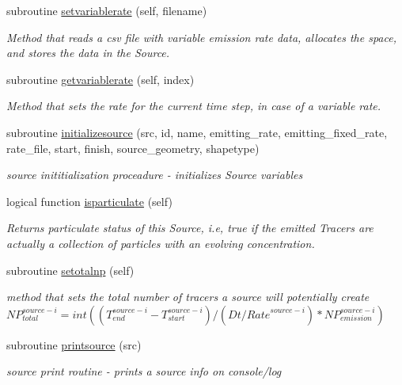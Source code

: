 \begin{DoxyCompactItemize}
subroutine \mbox{\hyperlink{namespacesources__mod_af7fab14b56573184d5ca4371409118b0}{setvariablerate}} (self, filename)
\begin{DoxyCompactList}\small\item\em Method that reads a csv file with variable emission rate data, allocates the space, and stores the data in the Source. \end{DoxyCompactList}\item 
subroutine \mbox{\hyperlink{namespacesources__mod_a0d56083fdc0453f03f9dfdb24f704ac4}{getvariablerate}} (self, index)
\begin{DoxyCompactList}\small\item\em Method that sets the rate for the current time step, in case of a variable rate. \end{DoxyCompactList}\item 
subroutine \mbox{\hyperlink{namespacesources__mod_aef3551e97236f03fc73fcf77276bb318}{initializesource}} (src, id, name, emitting\+\_\+rate, emitting\+\_\+fixed\+\_\+rate, rate\+\_\+file, start, finish, source\+\_\+geometry, shapetype)
\begin{DoxyCompactList}\small\item\em source inititialization proceadure -\/ initializes Source variables \end{DoxyCompactList}\item 
logical function \mbox{\hyperlink{namespacesources__mod_ac4e4f33da78d030e1b56a48789da6a05}{isparticulate}} (self)
\begin{DoxyCompactList}\small\item\em Returns particulate status of this Source, i.\+e, true if the emitted Tracers are actually a collection of particles with an evolving concentration. \end{DoxyCompactList}\item 
subroutine \mbox{\hyperlink{namespacesources__mod_a9a62c41b71d2d6ad85def74087542ef5}{setotalnp}} (self)
\begin{DoxyCompactList}\small\item\em method that sets the total number of tracers a source will potentially create ${NP}_{total}^{source-i}=int((T_{end}^{source-i}-T_{start}^{source-i})/(Dt/{Rate}^{source-i})*{NP}_{emission}^{source-i})$ \end{DoxyCompactList}\item 
subroutine \mbox{\hyperlink{namespacesources__mod_a641fe9ecc295e486a714c1aaa133d991}{printsource}} (src)
\begin{DoxyCompactList}\small\item\em source print routine -\/ prints a source info on console/log \end{DoxyCompactList}\end{DoxyCompactItemize}
